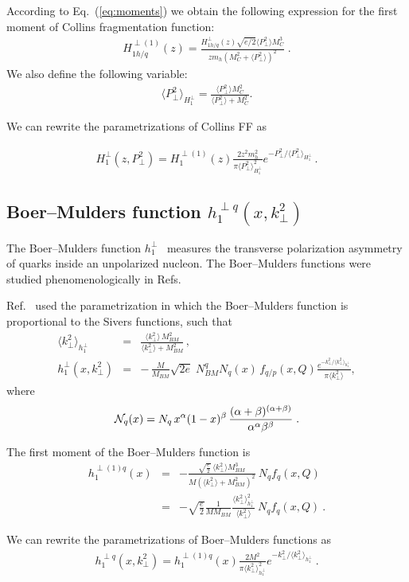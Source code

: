\documentclass[a4paper,11pt]{article}
\newcommand{\ba}{\begin{eqnarray}}
\newcommand{\ea}{\end{eqnarray}}
\newcommand{\la}{\langle}
\newcommand{\ra}{\rangle}
\newcommand{\mh}{ m_h }
\def\kperp{k_\perp}
\def\pperp{P_\perp}
\def\avkperp{\la \kperp^2 \ra}
\def\avpperp{\la \pperp^2 \ra}
\begin{document}
According to Eq.~(\ref{eq:moments}) we obtain the following expression for the first moment of
Collins fragmentation function:
\ba
H_{1 h/q}^{\perp (1)}(z) = \frac{H_{1 h/q}^{\perp}(z) \sqrt{e/2}  \avpperp M_C^3}{z \mh  (M_C^2+\avpperp)^2}\; .
\ea
We also define the following variable:
\ba
\avpperp_{H_1^\perp} = \frac{\avpperp M_C^2 }{\avpperp + M_C^2} .
\ea

We can rewrite the parametrizations of Collins FF as

\ba
H_{1}^{\perp}(z,\pperp^2) =  H_{1}^{\perp (1)}(z)   \frac{2 z^2 \mh^2}{\pi \avpperp_{H_{1}^\perp}^2} e^{-\pperp^2/{\avpperp_{H_{1}^\perp}}}
\label{coll-funct_new} \, .
\ea

\subsection{\boldmath Boer--Mulders function $h_{1}^{\perp q}(x,k_\perp^{2})$}
\label{App:basis-h1perp}

The Boer--Mulders function $h_{1}^{\perp}$~\cite{Boer:1997nt} measures
the transverse polarization asymmetry of quarks inside an unpolarized
nucleon. The Boer--Mulders functions were studied phenomenologically in
Refs.~\cite{Barone:2009hw,Barone:2010gk,Barone:2015ksa}

Ref.~\cite{Barone:2010gk} used the parametrization in which the Boer--Mulders function is proportional to the Sivers functions, such that
\ba
\avkperp_{h_1^\perp} &=& \frac{\avkperp \, M^2_{BM}}{\avkperp + M^2_{BM}} \, , \\
h_{1}^{\perp}(x, \kperp^2) &= &
- \,\frac{M}{M_{BM}}
\sqrt{2e}\; N_{BM}^q N_q (x)
\, f_{q/p} (x, Q)\frac{e^{-\kperp^2/\avkperp_{h_{1}^{\perp}}}}{\pi\avkperp},
\label{BM-dist}
\ea
 where
%
\ba
{\cal N}_q(x)= N_q \, x^{\alpha} (1-x)^{\beta} \,
\frac{(\alpha + \beta)^{(\alpha +\beta)}}
{\alpha^{\alpha} \beta^{\beta}}\; .
 \ea

The first moment of the Boer--Mulders function is
\ba
h_{1}^{\perp (1) q}(x)  &=& -\frac{\sqrt{\frac{e}{2}} \ \avkperp M_{BM}^3}{M (\avkperp + M_{BM}^2)^2}  \ {N}_q f_q(x, Q)  \nonumber \\
&=& -\sqrt{\frac{e}{2}} \frac{1}{M M_{BM}}  \frac{\avkperp_{h_1^\perp}^2}{\avkperp}    \ {N}_q  f_q(x, Q)
\label{bm} \ .
\ea

We can rewrite the parametrizations of Boer--Mulders functions as
\ba
h_{1}^{\perp q}(x,\kperp^2) =  h_{1}^{\perp (1) q}(x)   \frac{2 M^2}{\pi \avkperp_{h_{1}^\perp}^2} e^{-\kperp^2/{\avkperp_{h_{1}^\perp}}}\label{bm_new} \ .
\ea
\end{document}
